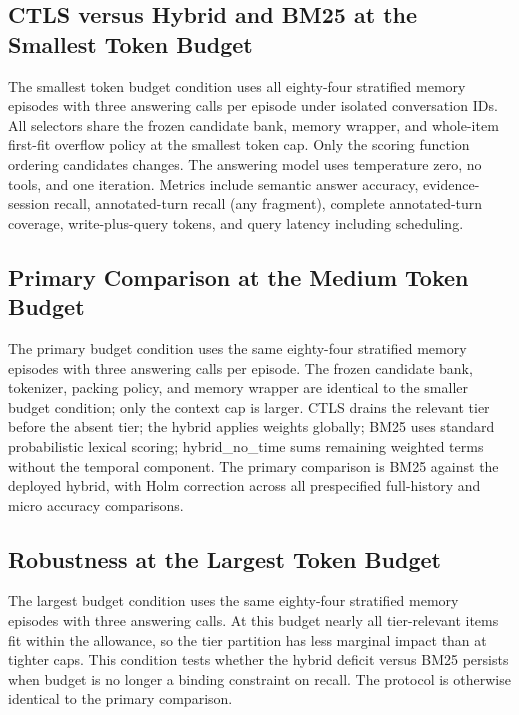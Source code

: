 \subsection{CTLS versus Hybrid and BM25 at the Smallest Token Budget}

\label{sec:setup_fair_baselines_512}

The smallest token budget condition uses all eighty-four stratified memory episodes with three answering calls per episode under isolated conversation IDs. All selectors share the frozen candidate bank, memory wrapper, and whole-item first-fit overflow policy at the smallest token cap. Only the scoring function ordering candidates changes. The answering model uses temperature zero, no tools, and one iteration. Metrics include semantic answer accuracy, evidence-session recall, annotated-turn recall (any fragment), complete annotated-turn coverage, write-plus-query tokens, and query latency including scheduling.

\subsection{Primary Comparison at the Medium Token Budget}

\label{sec:setup_fair_baselines}

The primary budget condition uses the same eighty-four stratified memory episodes with three answering calls per episode. The frozen candidate bank, tokenizer, packing policy, and memory wrapper are identical to the smaller budget condition; only the context cap is larger. CTLS drains the relevant tier before the absent tier; the hybrid applies weights globally; BM25 uses standard probabilistic lexical scoring; hybrid\_no\_time sums remaining weighted terms without the temporal component. The primary comparison is BM25 against the deployed hybrid, with Holm correction across all prespecified full-history and micro accuracy comparisons.

\subsection{Robustness at the Largest Token Budget}

\label{sec:setup_protocol_replication}

The largest budget condition uses the same eighty-four stratified memory episodes with three answering calls. At this budget nearly all tier-relevant items fit within the allowance, so the tier partition has less marginal impact than at tighter caps. This condition tests whether the hybrid deficit versus BM25 persists when budget is no longer a binding constraint on recall. The protocol is otherwise identical to the primary comparison.

